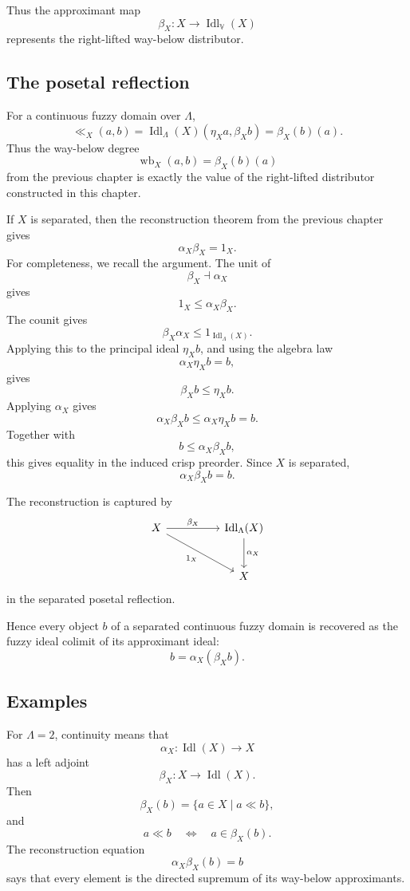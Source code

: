 Thus the approximant map
\[
    \beta_X:X\to\operatorname{Idl}_{\mathbb V}(X)
\]
represents the right-lifted way-below distributor.

\subsection{The posetal reflection}
\label{subsec:continuity-representability-posetal}

For a continuous fuzzy domain over \(\Lambda\),
\[
    \ll_X(a,b)
    =
    \operatorname{Idl}_\Lambda(X)(\eta_X a,\beta_X b)
    =
    \beta_X(b)(a).
\]
Thus the way-below degree
\[
    \operatorname{wb}_X(a,b)=\beta_X(b)(a)
\]
from the previous chapter is exactly the value of the right-lifted distributor
constructed in this chapter.

If \(X\) is separated, then the reconstruction theorem from the previous chapter
gives
\[
    \alpha_X\beta_X=1_X.
\]
For completeness, we recall the argument. The unit of
\[
    \beta_X\dashv\alpha_X
\]
gives
\[
    1_X\leq \alpha_X\beta_X.
\]
The counit gives
\[
    \beta_X\alpha_X\leq 1_{\operatorname{Idl}_\Lambda(X)}.
\]
Applying this to the principal ideal \(\eta_X b\), and using the algebra law
\[
    \alpha_X\eta_X b=b,
\]
gives
\[
    \beta_X b\leq \eta_X b.
\]
Applying \(\alpha_X\) gives
\[
    \alpha_X\beta_X b
    \leq
    \alpha_X\eta_X b
    =
    b.
\]
Together with
\[
    b\leq \alpha_X\beta_X b,
\]
this gives equality in the induced crisp preorder. Since \(X\) is separated,
\[
    \alpha_X\beta_X b=b.
\]

The reconstruction is captured by
\[
\begin{tikzcd}[column sep=huge,row sep=large]
X
    \ar[r,"\beta_X"]
    \ar[dr,"1_X"']
&
\operatorname{Idl}_\Lambda(X)
    \ar[d,"\alpha_X"]
\\
&
X
\end{tikzcd}
\]
in the separated posetal reflection.

Hence every object \(b\) of a separated continuous fuzzy domain is recovered as
the fuzzy ideal colimit of its approximant ideal:
\[
    b=\alpha_X(\beta_X b).
\]

\subsection{Examples}
\label{subsec:continuity-representability-examples}

\begin{example}
\label{ex:continuity-representability-crisp}
For \(\Lambda=2\), continuity means that
\[
    \alpha_X:\operatorname{Idl}(X)\to X
\]
has a left adjoint
\[
    \beta_X:X\to\operatorname{Idl}(X).
\]
Then
\[
    \beta_X(b)=\{a\in X\mid a\ll b\},
\]
and
\[
    a\ll b
    \quad\Longleftrightarrow\quad
    a\in \beta_X(b).
\]
The reconstruction equation
\[
    \alpha_X\beta_X(b)=b
\]
says that every element is the directed supremum of its way-below approximants.
\end{example}


